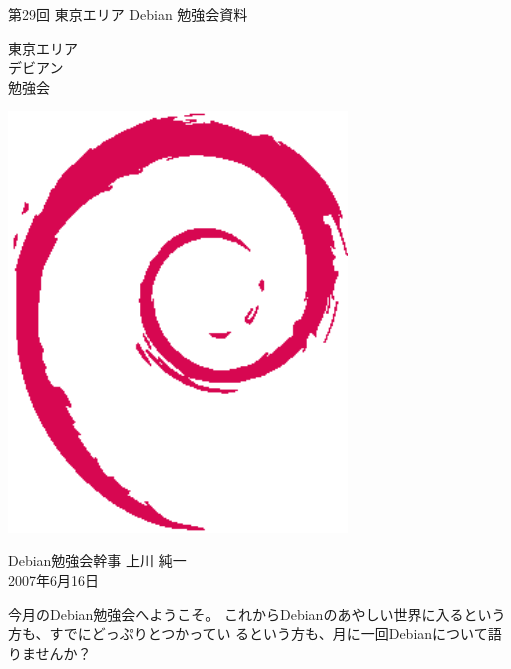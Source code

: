 \documentclass[mingoth,a4paper]{jsarticle}
\newcommand{\debmtgyear}{2007}
\newcommand{\debmtgdate}{16}
\newcommand{\debmtgmonth}{6}
\newcommand{\debmtgnumber}{29}
\begin{document}
\begin{titlepage}



 第\debmtgnumber{}回 東京エリア Debian 勉強会資料

\vspace{2cm}

\begin{minipage}[t]{0.6\hsize}
\vspace{-2cm}
{\fontsize{60}{60}
{\gt
東京エリア \\
デビアン \\
勉強会
}}
\end{minipage}
\begin{minipage}[b]{0.4\hsize}
\hspace{-1cm}\includegraphics[width=9cm]{image200502/openlogo-nd.eps}
\end{minipage}

\vspace{3cm}
\hfill{}Debian勉強会幹事 上川 純一\\
\hfill{}\debmtgyear{}年\debmtgmonth{}月\debmtgdate{}日

\thispagestyle{empty}
\end{titlepage}

 
 今月のDebian勉強会へようこそ。
 これからDebianのあやしい世界に入るという方も、すでにどっぷりとつかってい
 るという方も、月に一回Debianについて語りませんか？
\end{document}

